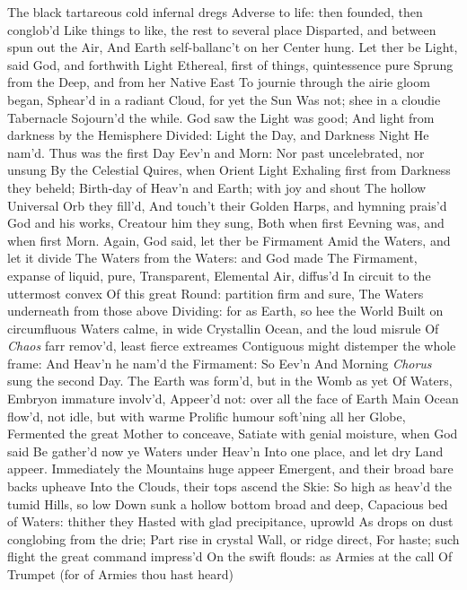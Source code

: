 \documentclass[11pt]{book}
\newcounter {first}
\begin{document}
The black tartareous cold infernal dregs 
Adverse to life: then founded, then conglob'd 
Like things to like, the rest to several place 
Disparted, and between spun out the Air, 
And Earth self-ballanc't on her Center hung. 
\quad Let ther be Light, said God, and forthwith Light 
Ethereal, first of things, quintessence pure 
Sprung from the Deep, and from her Native East 
To journie through the airie gloom began, 
Sphear'd in a radiant Cloud, for yet the Sun 
Was not; shee in a cloudie Tabernacle 
Sojourn'd the while.  God saw the Light was good; 
And light from darkness by the Hemisphere 
Divided: Light the Day, and Darkness Night 
He nam'd.  Thus was the first Day Eev'n and Morn: 
Nor past uncelebrated, nor unsung 
By the Celestial Quires, when Orient Light 
Exhaling first from Darkness they beheld; 
Birth-day of Heav'n and Earth; with joy and shout 
The hollow Universal Orb they fill'd, 
And touch't their Golden Harps, and hymning prais'd 
God and his works, Creatour him they sung, 
Both when first Eevning was, and when first Morn. 
\quad Again, God said, let ther be Firmament 
Amid the Waters, and let it divide 
The Waters from the Waters: and God made 
The Firmament, expanse of liquid, pure, 
Transparent, Elemental Air, diffus'd 
In circuit to the uttermost convex 
Of this great Round: partition firm and sure, 
The Waters underneath from those above 
Dividing: for as Earth, so hee the World 
Built on circumfluous Waters calme, in wide 
Crystallin Ocean, and the loud misrule 
Of \textit{Chaos} farr remov'd, least fierce extreames 
Contiguous might distemper the whole frame: 
And Heav'n he nam'd the Firmament: So Eev'n 
And Morning \textit{Chorus} sung the second Day. 
\quad The Earth was form'd, but in the Womb as yet 
Of Waters, Embryon immature involv'd, 
Appeer'd not: over all the face of Earth 
Main Ocean flow'd, not idle, but with warme 
Prolific humour soft'ning all her Globe, 
Fermented the great Mother to conceave, 
Satiate with genial moisture, when God said 
Be gather'd now ye Waters under Heav'n 
Into one place, and let dry Land appeer. 
Immediately the Mountains huge appeer 
Emergent, and their broad bare backs upheave 
Into the Clouds, their tops ascend the Skie: 
So high as heav'd the tumid Hills, so low 
Down sunk a hollow bottom broad and deep, 
Capacious bed of Waters: thither they 
Hasted with glad precipitance, uprowld 
As drops on dust conglobing from the drie; 
Part rise in crystal Wall, or ridge direct, 
For haste; such flight the great command impress'd 
On the swift flouds: as Armies at the call 
Of Trumpet (for of Armies thou hast heard) 
\end{document}
